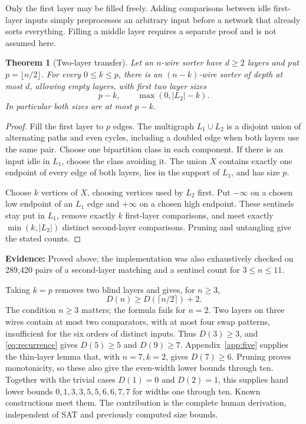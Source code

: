 \documentclass[11pt]{article}
\newtheorem{theorem}{Theorem}[section]
\newcommand{\status}[1]{\textbf{Evidence:} #1.}
\begin{document}
Only the first layer may be filled freely. Adding comparisons between idle first-layer inputs simply preprocesses an arbitrary input before a network that already sorts everything. Filling a middle layer requires a separate proof and is not assumed here.

\begin{theorem}[Two-layer transfer]\label{thm:transfer}
Let an $n$-wire sorter have $d\ge2$ layers and put $p=\lfloor n/2\rfloor$. For every $0\le k\le p$, there is an $(n-k)$-wire sorter of depth at most $d$, allowing empty layers, with first two layer sizes
\[
 p-k,\qquad \max(0,|L_2|-k).
\]
In particular both sizes are at most $p-k$.
\end{theorem}
\begin{proof}
Fill the first layer to $p$ edges. The multigraph $L_1\cup L_2$ is a disjoint union of alternating paths and even cycles, including a doubled edge when both layers use the same pair. Choose one bipartition class in each component. If there is an input idle in $L_1$, choose the class avoiding it. The union $X$ contains exactly one endpoint of every edge of both layers, lies in the support of $L_1$, and has size $p$.

Choose $k$ vertices of $X$, choosing vertices used by $L_2$ first. Put $-\infty$ on a chosen low endpoint of an $L_1$ edge and $+\infty$ on a chosen high endpoint. These sentinels stay put in $L_1$, remove exactly $k$ first-layer comparisons, and meet exactly $\min(k,|L_2|)$ distinct second-layer comparisons. Pruning and untangling give the stated counts.
\end{proof}

\status{Proved above; the implementation was also exhaustively checked on 289,420 pairs of a second-layer matching and a sentinel count for $3\le n\le11$}

Taking $k=p$ removes two blind layers and gives, for $n\ge3$,
\begin{equation}\label{eq:recurrence}
D(n)\ge D(\lceil n/2\rceil)+2.
\end{equation}
The condition $n\ge3$ matters; the formula fails for $n=2$. Two layers on three wires contain at most two comparators, with at most four swap patterns, insufficient for the six orders of distinct inputs. Thus $D(3)\ge3$, and \eqref{eq:recurrence} gives $D(5)\ge5$ and $D(9)\ge7$. Appendix~\ref{app:five} supplies the thin-layer lemma that, with $n=7,k=2$, gives $D(7)\ge6$. Pruning proves monotonicity, so these also give the even-width lower bounds through ten. Together with the trivial cases $D(1)=0$ and $D(2)=1$, this supplies hand lower bounds $0,1,3,3,5,5,6,6,7,7$ for widths one through ten. Known constructions meet them. The contribution is the complete human derivation, independent of SAT and previously computed size bounds.
\end{document}
